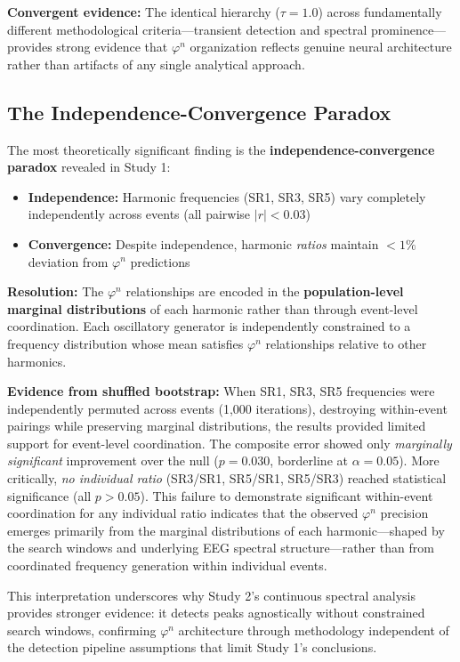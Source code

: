 \documentclass[11pt,a4paper]{article}
\newcommand{\phisym}{\varphi}
\begin{document}
\textbf{Convergent evidence:} The identical hierarchy ($\tau = 1.0$) across fundamentally different methodological criteria---transient detection and spectral prominence---provides strong evidence that $\phisym^n$ organization reflects genuine neural architecture rather than artifacts of any single analytical approach.

\subsection{The Independence-Convergence Paradox}

The most theoretically significant finding is the \textbf{independence-convergence paradox} revealed in Study 1:

\begin{itemize}
    \item \textbf{Independence:} Harmonic frequencies (SR1, SR3, SR5) vary completely independently across events (all pairwise $|r| < 0.03$)
    \item \textbf{Convergence:} Despite independence, harmonic \textit{ratios} maintain $<1\%$ deviation from $\phisym^n$ predictions
\end{itemize}

\textbf{Resolution:} The $\phisym^n$ relationships are encoded in the \textbf{population-level marginal distributions} of each harmonic rather than through event-level coordination. Each oscillatory generator is independently constrained to a frequency distribution whose mean satisfies $\phisym^n$ relationships relative to other harmonics.

\textbf{Evidence from shuffled bootstrap:} When SR1, SR3, SR5 frequencies were independently permuted across events (1,000 iterations), destroying within-event pairings while preserving marginal distributions, the results provided limited support for event-level coordination. The composite error showed only \textit{marginally significant} improvement over the null ($p = 0.030$, borderline at $\alpha = 0.05$). More critically, \textit{no individual ratio} (SR3/SR1, SR5/SR1, SR5/SR3) reached statistical significance (all $p > 0.05$). This failure to demonstrate significant within-event coordination for any individual ratio indicates that the observed $\phisym^n$ precision emerges primarily from the marginal distributions of each harmonic---shaped by the search windows and underlying EEG spectral structure---rather than from coordinated frequency generation within individual events.

This interpretation underscores why Study 2's continuous spectral analysis provides stronger evidence: it detects peaks agnostically without constrained search windows, confirming $\phisym^n$ architecture through methodology independent of the detection pipeline assumptions that limit Study 1's conclusions.
\end{document}
